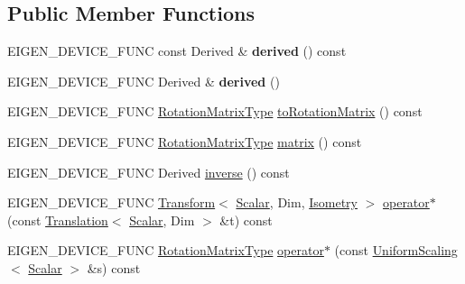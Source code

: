 \subsection*{Public Member Functions}
\begin{DoxyCompactItemize}
\item 
\mbox{\label{class_eigen_1_1_rotation_base_a1cae30fa6779f33fb835c91d4c65f54d}} 
E\+I\+G\+E\+N\+\_\+\+D\+E\+V\+I\+C\+E\+\_\+\+F\+U\+NC const Derived \& {\bfseries derived} () const
\item 
\mbox{\label{class_eigen_1_1_rotation_base_a32a9b98ea4ea05b04a5f5f4b138daef8}} 
E\+I\+G\+E\+N\+\_\+\+D\+E\+V\+I\+C\+E\+\_\+\+F\+U\+NC Derived \& {\bfseries derived} ()
\item 
E\+I\+G\+E\+N\+\_\+\+D\+E\+V\+I\+C\+E\+\_\+\+F\+U\+NC \hyperlink{class_eigen_1_1_rotation_base_a83602509674c9d635551998460342951}{Rotation\+Matrix\+Type} \hyperlink{class_eigen_1_1_rotation_base_aac726e89402a427c605514ce31b01e42}{to\+Rotation\+Matrix} () const
\item 
E\+I\+G\+E\+N\+\_\+\+D\+E\+V\+I\+C\+E\+\_\+\+F\+U\+NC \hyperlink{class_eigen_1_1_rotation_base_a83602509674c9d635551998460342951}{Rotation\+Matrix\+Type} \hyperlink{class_eigen_1_1_rotation_base_a14ce23df5f0b2593a466f8130fe6bac9}{matrix} () const
\item 
E\+I\+G\+E\+N\+\_\+\+D\+E\+V\+I\+C\+E\+\_\+\+F\+U\+NC Derived \hyperlink{class_eigen_1_1_rotation_base_a2835ea92940986b4220cf47538a6bc41}{inverse} () const
\item 
E\+I\+G\+E\+N\+\_\+\+D\+E\+V\+I\+C\+E\+\_\+\+F\+U\+NC \hyperlink{group___geometry___module_class_eigen_1_1_transform}{Transform}$<$ \hyperlink{class_eigen_1_1_rotation_base_af9b43eac462d7aa70b018efd49c13ef4}{Scalar}, Dim, \hyperlink{group__enums_ggaee59a86102f150923b0cac6d4ff05107a080cd5366173608f701cd945c2335568}{Isometry} $>$ \hyperlink{class_eigen_1_1_rotation_base_a4b09a2174ee14f0aa71bc0285c9045a9}{operator$\ast$} (const \hyperlink{group___geometry___module_class_eigen_1_1_translation}{Translation}$<$ \hyperlink{class_eigen_1_1_rotation_base_af9b43eac462d7aa70b018efd49c13ef4}{Scalar}, Dim $>$ \&t) const
\item 
E\+I\+G\+E\+N\+\_\+\+D\+E\+V\+I\+C\+E\+\_\+\+F\+U\+NC \hyperlink{class_eigen_1_1_rotation_base_a83602509674c9d635551998460342951}{Rotation\+Matrix\+Type} \hyperlink{class_eigen_1_1_rotation_base_ad7b31a12a4f8f2584b8937f958bd6ea6}{operator$\ast$} (const \hyperlink{class_eigen_1_1_uniform_scaling}{Uniform\+Scaling}$<$ \hyperlink{class_eigen_1_1_rotation_base_af9b43eac462d7aa70b018efd49c13ef4}{Scalar} $>$ \&s) const

\end{DoxyCompactItemize}
